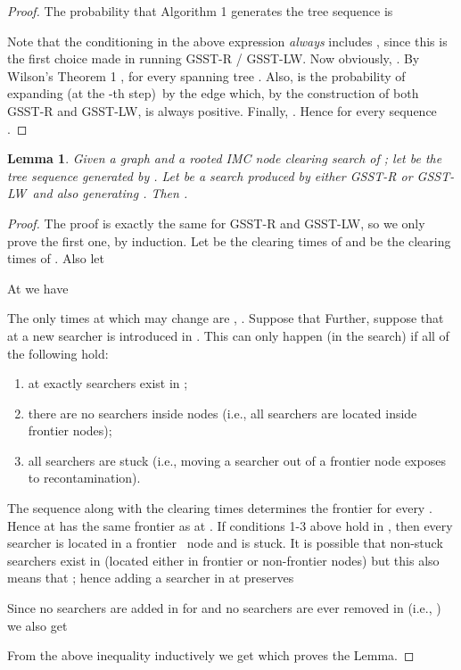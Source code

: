 \documentclass[11pt]{article}\usepackage{amsmath}
\newtheorem{lemma}[theorem]{Lemma}
{\theoremstyle{definition}
\newtheorem{notation}[theorem]{Notation}
}
\begin{document}
\begin{proof}
The probability that Algorithm 1 generates the tree sequence  is

Note that the conditioning in the above expression \emph{always} includes
, since this is the first choice made in running GSST-R /
GSST-LW. Now obviously, .
By Wilson's Theorem 1 \cite{Wilson1}, 
for every spanning tree . Also,  is the probability of expanding (at the -th step)\  by
the edge  which, by the
construction of both GSST-R and GSST-LW, is always positive. Finally,
. Hence  for every
sequence .
\end{proof}

\begin{lemma}
\label{prp0509}Given a graph  and a rooted
IMC node clearing search  of ; let  be the tree
sequence generated by . Let  be a search
produced by either GSST-R or GSST-LW\ and \emph{also} generating . Then
.
\end{lemma}

\begin{proof}
The proof is exactly the same for GSST-R and GSST-LW, so we only prove the
first one, by induction. Let  be the clearing times of
 and  be the clearing times of
. Also let 

At we have 

The only times at which  may change
are ,  . Suppose that
Further, suppose that at  a new searcher is introduced in
. This can only happen (in the 
search) if all of the following hold:

\begin{enumerate}
\item at  exactly  searchers exist in ;

\item there are no searchers inside nodes  (i.e., all
searchers are located inside frontier nodes);

\item all searchers are stuck (i.e., moving a searcher out of a frontier node
 exposes  to recontamination).
\end{enumerate}

The sequence  along with the clearing times determines the frontier  for every . Hence  at  has
the same frontier as  at . If conditions 1-3 above hold in
, then every searcher is located in a frontier \ node and
is stuck. It is possible that non-stuck searchers exist in 
(located either in frontier or non-frontier nodes) but this also means that
; hence adding a searcher in 
at  preserves

Since no searchers are added in  for  and no searchers are ever removed
in  (i.e., ) we also get

From the above inequality inductively we get which proves the Lemma.
\end{proof}
\end{document}
